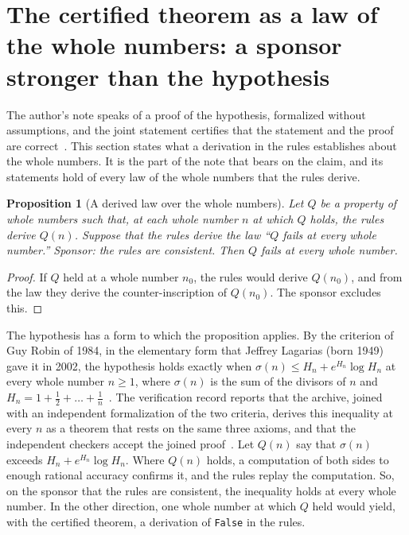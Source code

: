 \documentclass[11pt]{article}
\newtheorem{proposition}[theorem]{Proposition}
\theoremstyle{definition}
\theoremstyle{remark}
\DeclareRobustCommand{\lean}[1]{{\renewcommand{\_}{\textunderscore\allowbreak}\texttt{#1}}}
\newcommand{\False}{\lean{False}}
\begin{document}
\section{The certified theorem as a law of the whole numbers: a sponsor stronger than the hypothesis}\label{sec:sponsor}

The author's note speaks of a proof of the hypothesis, formalized without assumptions, and the joint statement certifies that the statement and the proof are correct~\citep{alpoge,leanblog}. This section states what a derivation in the rules establishes about the whole numbers. It is the part of the note that bears on the claim, and its statements hold of every law of the whole numbers that the rules derive.

\begin{proposition}[A derived law over the whole numbers]\label{prop:tallies}
Let $Q$ be a property of whole numbers such that, at each whole number $n$ at which $Q$ holds, the rules derive $Q(n)$. Suppose that the rules derive the law ``$Q$ fails at every whole number.'' Sponsor: the rules are consistent. Then $Q$ fails at every whole number.
\end{proposition}

\begin{proof}
If $Q$ held at a whole number $n_0$, the rules would derive $Q(n_0)$, and from the law they derive the counter-inscription of $Q(n_0)$. The sponsor excludes this.
\end{proof}

The hypothesis has a form to which the proposition applies. By the criterion of Guy Robin of 1984, in the elementary form that Jeffrey Lagarias (born 1949) gave it in 2002, the hypothesis holds exactly when $\sigma(n)\le H_n+e^{H_n}\log H_n$ at every whole number $n\ge1$, where $\sigma(n)$ is the sum of the divisors of $n$ and $H_n=1+\tfrac12+\dots+\tfrac1n$~\citep{robin84,lagarias02}. The verification record reports that the archive, joined with an independent formalization of the two criteria, derives this inequality at every $n$ as a theorem that rests on the same three axioms, and that the independent checkers accept the joined proof~\citep{sutherland}. Let $Q(n)$ say that $\sigma(n)$ exceeds $H_n+e^{H_n}\log H_n$. Where $Q(n)$ holds, a computation of both sides to enough rational accuracy confirms it, and the rules replay the computation. So, on the sponsor that the rules are consistent, the inequality holds at every whole number. In the other direction, one whole number at which $Q$ held would yield, with the certified theorem, a derivation of \False{} in the rules.
\end{document}
